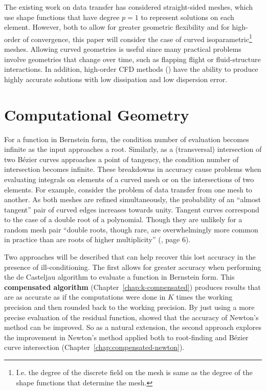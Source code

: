 The existing work on data transfer has considered straight-sided meshes,
which use shape functions that have degree \(p = 1\) to represent solutions
on each element. However, both to allow for greater geometric flexibility
and for high-order of convergence, this paper will consider the case
of curved isoparametric\footnote{I.e. the degree of the discrete field on the
mesh is same as the degree of the shape functions that determine the
mesh.} meshes. Allowing curved geometries is useful since many practical
problems involve geometries that change over time, such as flapping flight
or fluid-structure interactions. In addition, high-order CFD methods
(\cite{Wang2013}) have the ability to produce highly accurate solutions
with low dissipation and low dispersion error.

\section{Computational Geometry}

For a function in Bernstein form, the condition number of evaluation
becomes infinite as the input approaches a root. Similarly,
as a (transversal) intersection of two B\'{e}zier curves approaches a
point of tangency, the condition number of intersection becomes
infinite. These breakdowns in accuracy cause problems when evaluating
integrals on elements of a curved mesh or on the intersections of two
elements. For example, consider the problem of data transfer from
one mesh to another. As both meshes are refined simultaneously, the
probability of an ``almost tangent'' pair of curved edges increases
towards unity. Tangent curves correspond to the case of a double root
of a polynomial. Though they are unlikely for a random mesh pair
``double roots, though rare, are overwhelmingly more common in practice
than are roots of higher multiplicity'' (\cite{Kahan1972}, page 6).

Two approaches will be described that can help recover this lost accuracy
in the presence of ill-conditioning. The first allows for greater
accuracy when performing the de Casteljau algorithm to evaluate
a function in Bernstein form. This \textbf{compensated algorithm}
(Chapter~\ref{chap:k-compensated}) produces results that are as accurate as if
the computations were done in \(K\) times the working precision
and then rounded back to the working precision. By just using a
more precise evaluation of the residual function,
\cite{Tisseur2001} showed that the accuracy of Newton's method can
be improved. So as a natural extension, the second approach
explores the improvement in Newton's method applied both to
root-finding and B\'{e}zier curve intersection
(Chapter~\ref{chap:compensated-newton}).


